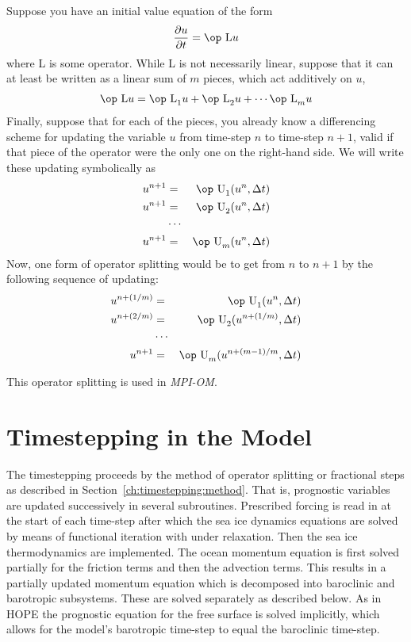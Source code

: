 Suppose you have an initial value equation of the form
\begin{eqnarray}
{{\partial u}\over{\partial t}} = \mbox{\op L}u
\end{eqnarray}
where {\op L} is some operator. While {\op L} is not necessarily linear, suppose that it can
at least be written as a linear sum of $m$ pieces, which act additively on $u$,
\begin{eqnarray}
\mbox{\op L}u=\mbox{\op L}_1u+\mbox{\op L}_2u + \cdots \mbox{\op L}_m u
\end{eqnarray}
Finally, suppose that for each of the pieces, you already know a differencing scheme
for updating the variable $u$ from time-step $n$ to time-step $n+1$, valid if
that piece of the operator were the only one on the right-hand side. We will write
these updating symbolically as
\begin{eqnarray}
u^{n+1} & = & \mbox{\op U}_1(u^n,\Delta t)\nonumber \\
u^{n+1} & = & \mbox{\op U}_2(u^n,\Delta t)\nonumber \\
        & \cdots & \\
u^{n+1} & = & \mbox{\op U}_m(u^n,\Delta t)\nonumber
\end{eqnarray}
Now, one form of operator splitting would be to get from $n$ to $n+1$ by the
following sequence of updating:
\begin{eqnarray}
u^{n+(1/m)} & = & \mbox{\op U}_1(u^n,\Delta t) \nonumber \\
u^{n+(2/m)} & = & \mbox{\op U}_2(u^{n+(1/m)},\Delta t) \nonumber \\
            & \cdots & \\
u^{n+1} & = & \mbox{\op U}_m(u^{n+(m-1)/m},\Delta t) \nonumber
\end{eqnarray}

This operator splitting is used in {\sl MPI-OM}.

\section{Timestepping in the Model}
\label{ch:timestepping:model}

The timestepping proceeds by the method of operator splitting or fractional steps
as described in Section~\ref{ch:timestepping:method}. 
That is, prognostic variables are updated
successively in several subroutines.
Prescribed forcing is read in at the start of each time-step after which the 
sea ice dynamics equations are solved by means of 
functional iteration with under relaxation.
Then the sea ice thermodynamics are implemented.
The ocean momentum equation  is first solved partially for the friction terms and 
then the advection terms.
This results in a partially updated momentum equation which is 
decomposed into baroclinic and barotropic subsystems.
These are solved separately as described below.
As in HOPE \citep{wolff97} the prognostic equation for the free surface is solved
implicitly, which allows for the model's barotropic time-step
to equal the baroclinic time-step.

